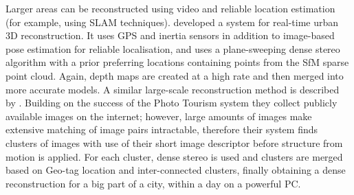 Larger areas can be reconstructed using video and reliable location estimation (for example, using SLAM techniques).  developed a system for real-time urban 3D reconstruction. It uses GPS and inertia sensors in addition to image-based pose estimation for reliable localisation, and uses a plane-sweeping dense stereo algorithm with a prior preferring locations containing points from the SfM sparse point cloud. Again, depth maps are created at a high rate and then merged into more accurate models. A similar large-scale reconstruction method is described by . Building on the success of the Photo Tourism system \cite{Snavely2006} they collect publicly available images on the internet; however, large amounts of images make extensive matching of image pairs intractable, therefore their system finds clusters of images with use of their short image descriptor before structure from motion is applied. For each cluster, dense stereo is used and clusters are merged based on Geo-tag location and inter-connected clusters, finally obtaining a dense reconstruction for a big part of a city, within a day on a powerful PC.


